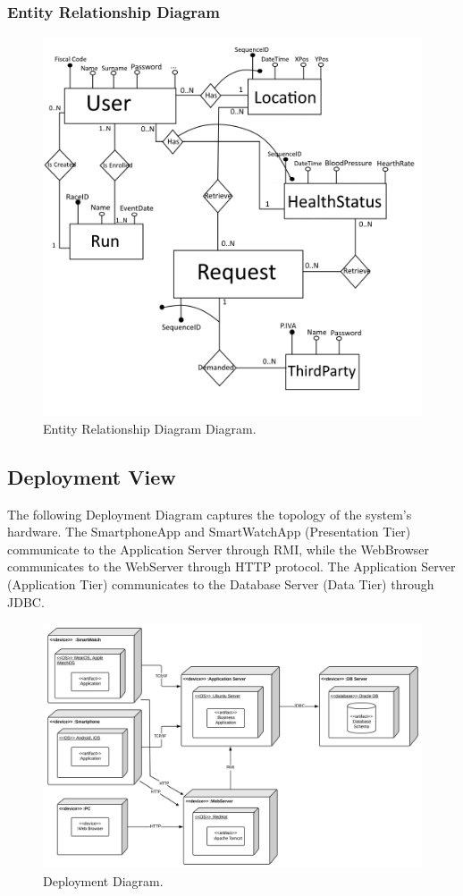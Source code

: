 \subsubsection{Entity Relationship Diagram}
\begin{figure}[H]
\centering
\includegraphics[scale=0.65]{Images/ERDiagram.png}
\caption{Entity Relationship Diagram Diagram.}
\end{figure}

\newpage
\subsection{Deployment View}
The following Deployment Diagram captures the topology of the system's hardware.
The SmartphoneApp and SmartWatchApp (Presentation Tier) communicate to the Application Server through RMI, while the WebBrowser communicates to the WebServer through HTTP protocol. The Application Server (Application Tier) communicates to the Database Server (Data Tier) through JDBC.

\begin{figure}[H]
\centering
\includegraphics[scale=0.12]{Images/DeploymentDiagram.png}
\caption{Deployment Diagram.}
\end{figure}

